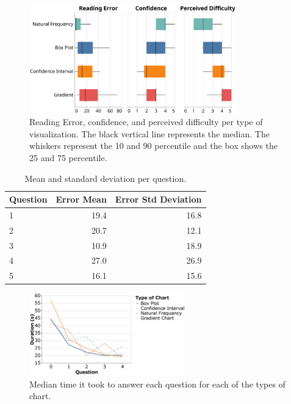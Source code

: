 \documentclass[a4paper,3p,sort&compress]{elsarticle}
\begin{document}
\begin{figure}
  \centering
  \includegraphics[width=0.8\textwidth]{comparison}
  \caption{\label{figure:errors}Reading Error, confidence, and perceived
    difficulty per type of visualization. The black vertical line represents the
    median. The whiskers represent the 10 and 90 percentile and the box shows
    the 25 and 75 percentile.}
\end{figure}

\begin{table}
  \centering
  \begin{tabular}{lrr}
    \toprule
    {}Question &     Error Mean &        Error Std Deviation \\
    \midrule
    1 &  19.4 &  16.8 \\
    2 &  20.7 &  12.1 \\
    3 &  10.9 &  18.9 \\
    4 &  27.0 &  26.9 \\
    5 &  16.1 &  15.6 \\
    \bottomrule
  \end{tabular}
  \caption{Mean and standard deviation per question.}
  \label{table:resultsperquestion}
\end{table}

\begin{figure}
  \centering
  \includegraphics[width=0.6\textwidth]{duration_evo2}
  \caption{\label{figure:duration} Median time it took to answer each question
    for each of the types of chart.}
\end{figure}
\end{document}
